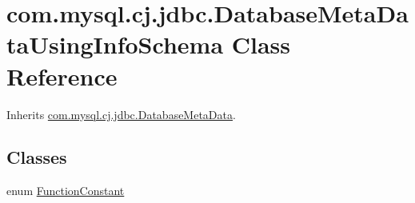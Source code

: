 \hypertarget{classcom_1_1mysql_1_1cj_1_1jdbc_1_1_database_meta_data_using_info_schema}{}\section{com.\+mysql.\+cj.\+jdbc.\+Database\+Meta\+Data\+Using\+Info\+Schema Class Reference}
\label{classcom_1_1mysql_1_1cj_1_1jdbc_1_1_database_meta_data_using_info_schema}


Inherits \mbox{\hyperlink{classcom_1_1mysql_1_1cj_1_1jdbc_1_1_database_meta_data}{com.\+mysql.\+cj.\+jdbc.\+Database\+Meta\+Data}}.

\subsection*{Classes}
\begin{DoxyCompactItemize}
\item 
enum \mbox{\hyperlink{enumcom_1_1mysql_1_1cj_1_1jdbc_1_1_database_meta_data_using_info_schema_1_1_function_constant}{Function\+Constant}}
\end{DoxyCompactItemize}
